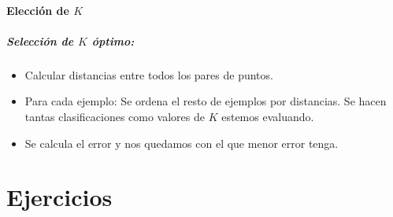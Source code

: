 \documentclass{apuntes}
\begin{document}
\subsubsection{Elección de $K$}

\paragraph{Selección de $K$ óptimo:}
\begin{itemize}
	\item Calcular distancias entre todos los pares de puntos.
	\item Para cada ejemplo:
		\subitem Se ordena el resto de ejemplos por distancias.
		\subitem Se hacen tantas clasificaciones como valores de  $K$ estemos evaluando.
	\item Se calcula el error y nos quedamos con el que menor error tenga.
\end{itemize}


\appendix


\chapter{Ejercicios}

\printindex
\end{document}
